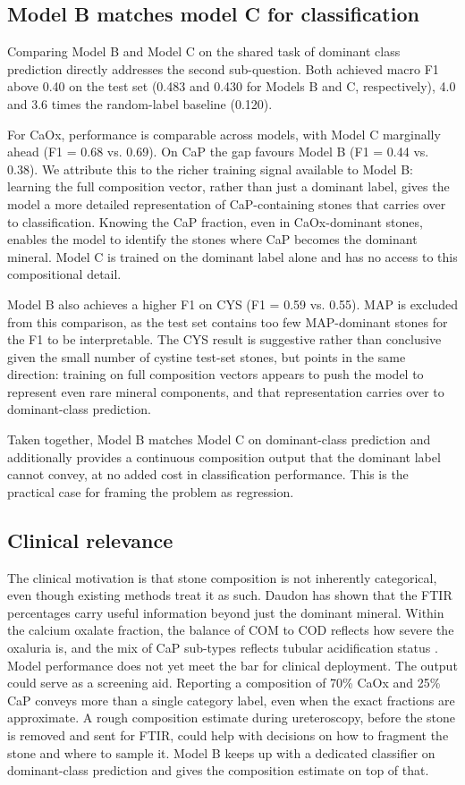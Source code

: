 \documentclass[10pt,twocolumn]{article}
\begin{document}
\subsection*{Model B matches model C for classification}
 
Comparing Model B and Model C on the shared task of dominant class prediction directly addresses the second sub-question. Both achieved macro F1 above 0.40 on the test set (0.483 and 0.430 for Models B and C, respectively), 4.0 and 3.6 times the random-label baseline (0.120).
 
For CaOx, performance is comparable across models, with Model C marginally ahead (F1 = 0.68 vs. 0.69). On CaP the gap favours Model B (F1 = 0.44 vs. 0.38). We attribute this to the richer training signal available to Model B: learning the full composition vector, rather than just a dominant label, gives the model a more detailed representation of CaP-containing stones that carries over to classification. Knowing the CaP fraction, even in CaOx-dominant stones, enables the model to identify the stones where CaP becomes the dominant mineral. Model C is trained on the dominant label alone and has no access to this compositional detail.

Model B also achieves a higher F1 on CYS (F1 = 0.59 vs. 0.55). MAP is excluded from this comparison, as the test set contains too few MAP-dominant stones for the F1 to be interpretable. The CYS result is suggestive rather than conclusive given the small number of cystine test-set stones, but points in the same direction: training on full composition vectors appears to push the model to represent even rare mineral components, and that representation carries over to dominant-class prediction.

Taken together, Model B matches Model C on dominant-class prediction and additionally provides a continuous composition output that the dominant label cannot convey, at no added cost in classification performance. This is the practical case for framing the problem as regression.

\subsection*{Clinical relevance}
 
The clinical motivation is that stone composition is not inherently categorical, even though existing methods treat it as such. Daudon has shown that the FTIR percentages carry useful information beyond just the dominant mineral. Within the calcium oxalate fraction, the balance of COM to COD reflects how severe the oxaluria is, and the mix of CaP sub-types reflects tubular acidification status \cite{Daudon2014}.
Model performance does not yet meet the bar for clinical deployment. The output could serve as a screening aid. Reporting a composition of 70\% CaOx and 25\% CaP conveys more than a single category label, even when the exact fractions are approximate. A rough composition estimate during ureteroscopy, before the stone is removed and sent for FTIR, could help with decisions on how to fragment the stone and where to sample it. Model B keeps up with a dedicated classifier on dominant-class prediction and gives the composition estimate on top of that.
 
\end{document}
